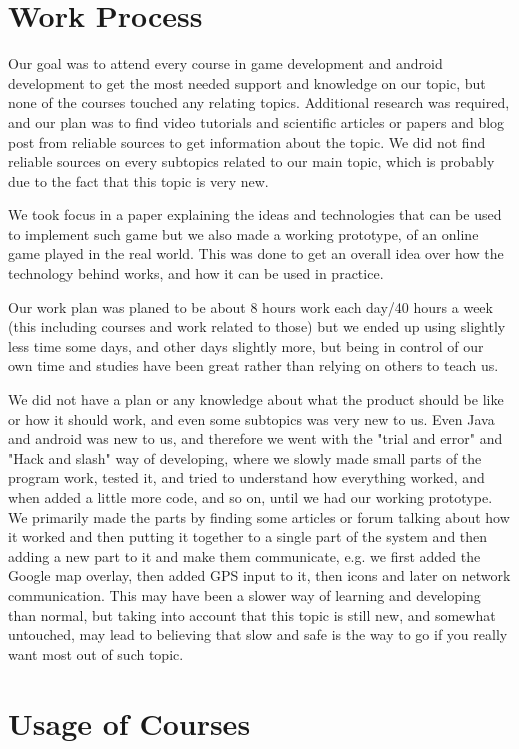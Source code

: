 \section{Work Process}

Our goal was to attend every course in game development and android development to get the most needed support and knowledge on our topic, but none of the courses touched any relating topics. Additional research was required, and our plan was to find video tutorials and scientific articles or papers and blog post from reliable sources to get information about the topic. We did not find reliable sources on every subtopics related to our main topic, which is probably due to the fact that this topic is very new.

We took focus in a paper explaining the ideas and technologies that can be used to implement such game but we also made a working prototype, of an online game played in the real world. This was done to get an overall idea over how the technology behind works, and how it can be used in practice.

Our work plan was planed to be about 8 hours work each day/40 hours a week (this including courses and work related to those) but we ended up using slightly less time some days, and other days slightly more, but being in control of our own time and studies have been great rather than relying on others to teach us.

We did not have a plan or any knowledge about what the product should be like or how it should work, and even some subtopics was very new to us. Even Java and android was new to us, and therefore we went with the "trial and error" and "Hack and slash" way of developing, where we slowly made small parts of the program work, tested it, and tried to understand how everything worked, and when added a little more code, and so on, until we had our working prototype. We primarily made the parts by finding some articles or forum talking about how it worked and then putting it together to a single part of the system and then adding a new part to it and make them communicate, e.g. we first added the Google map overlay, then added GPS input to it, then icons and later on network communication. This may have been a slower way of learning and developing than normal, but taking into account that this topic is still new, and somewhat untouched, may lead to believing that slow and safe is the way to go if you really want most out of such topic.


\section{Usage of Courses}

